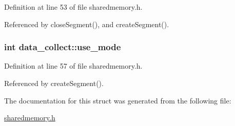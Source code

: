 Definition at line 53 of file sharedmemory.h.

Referenced by closeSegment(), and createSegment().\hypertarget{structdata__collect_a68f32ef0afb09d6369f13f5f4552bf3d}{
\subsubsection[{use\_\-mode}]{\setlength{\rightskip}{0pt plus 5cm}int {\bf data\_\-collect::use\_\-mode}}}
\label{structdata__collect_a68f32ef0afb09d6369f13f5f4552bf3d}


Definition at line 57 of file sharedmemory.h.

Referenced by createSegment().

The documentation for this struct was generated from the following file:\begin{DoxyCompactItemize}
\item 
\hyperlink{sharedmemory_8h}{sharedmemory.h}\end{DoxyCompactItemize}
